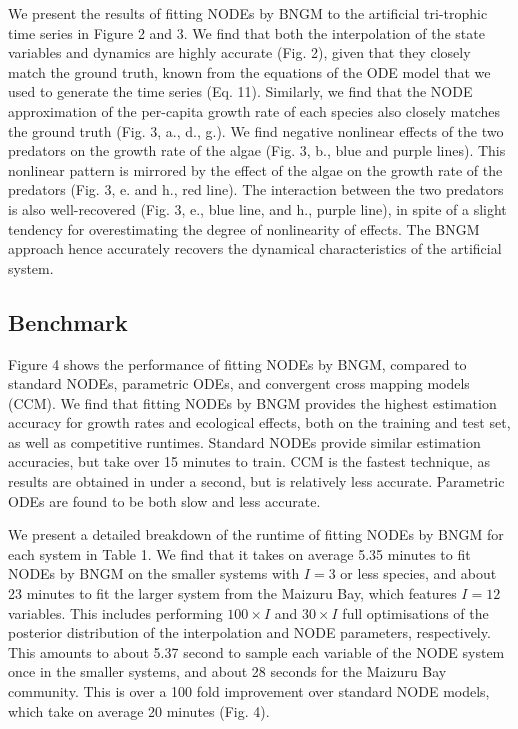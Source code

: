 \documentclass[11pt, oneside]{article}
\begin{document}
We present the results of fitting NODEs by BNGM to the artificial tri-trophic time series in Figure 2 and 3.
We find that both the interpolation of the state variables and dynamics are highly accurate (Fig. 2), given that they closely match the ground truth, known from the equations of the ODE model that we used to generate the time series (Eq. 11).
Similarly, we find that the NODE approximation of the per-capita growth rate of each species also closely matches the ground truth (Fig. 3, a., d., g.). 
We find negative nonlinear effects of the two predators on the growth rate of the algae (Fig. 3, b., blue and purple lines).
This nonlinear pattern is mirrored by the effect of the algae on the growth rate of the predators (Fig. 3, e. and h., red line).
The interaction between the two predators is also well-recovered (Fig. 3, e., blue line, and h., purple line), in spite of a slight tendency for overestimating the degree of nonlinearity of effects.
The BNGM approach hence accurately recovers the dynamical characteristics of the artificial system.

\subsection{Benchmark}

Figure 4 shows the performance of fitting NODEs by BNGM, compared to standard NODEs, parametric ODEs, and convergent cross mapping models (CCM).
We find that fitting NODEs by BNGM provides the highest estimation accuracy for growth rates and ecological effects, both on the training and test set, as well as competitive runtimes. 
Standard NODEs provide similar estimation accuracies, but take over 15 minutes to train. 
CCM is the fastest technique, as results are obtained in under a second, but is relatively less accurate.
Parametric ODEs are found to be both slow and less accurate.

We present a detailed breakdown of the runtime of fitting NODEs by BNGM for each system in Table 1.
We find that it takes on average 5.35 minutes to fit NODEs by BNGM on the smaller systems with $I = 3$ or less species, and about 23 minutes to fit the larger system from the Maizuru Bay, which features $I = 12$ variables.
This includes performing $100 \times I$ and $30 \times I$ full optimisations of the posterior distribution of the interpolation and NODE parameters, respectively. 
This amounts to about 5.37 second to sample each variable of the NODE system once in the smaller systems, and about 28 seconds for the Maizuru Bay community.
This is over a 100 fold improvement over standard NODE models, which take on average 20 minutes (Fig. 4).
\end{document}
